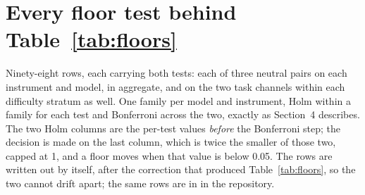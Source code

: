 \appendix
\section{Every floor test behind Table~\ref{tab:floors}}

Ninety-eight rows, each carrying both tests: each of three neutral pairs
on each instrument and model, in aggregate, and on the two task channels within
each difficulty stratum as well. One family per model and instrument, Holm
within a family for each test and Bonferroni across the two, exactly as
Section~4 describes. The two Holm columns are the per-test values \emph{before}
the Bonferroni step; the decision is made on the last column, which is twice the smaller of those
two, capped at 1, and a floor moves when that value is below 0.05. The rows are written out by
 itself, after the correction that produced
Table~\ref{tab:floors}, so the two cannot drift apart; the same rows are in
 in the repository.

